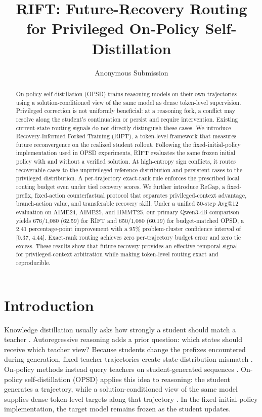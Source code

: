 \documentclass[letterpaper]{article}
\title{RIFT: Future-Recovery Routing for Privileged On-Policy Self-Distillation}
\author{Anonymous Submission}
\begin{document}
\maketitle

\begin{abstract}
On-policy self-distillation (OPSD) trains reasoning models on their own
trajectories using a solution-conditioned view of the same model as dense
token-level supervision. Privileged correction is not uniformly beneficial:
at a reasoning fork, a conflict may resolve along the student's continuation
or persist and require intervention. Existing current-state routing signals do
not directly distinguish these cases. We introduce Recovery-Informed Forked
Training (RIFT), a token-level framework that measures future reconvergence on
the realized student rollout. Following the fixed-initial-policy implementation
used in OPSD experiments, RIFT evaluates the same frozen initial policy with
and without a verified solution. At high-entropy sign conflicts, it routes
recoverable cases to the unprivileged reference distribution and persistent
cases to the privileged distribution. A per-trajectory exact-rank rule
enforces the prescribed local routing budget even under tied recovery scores.
We further introduce ReGap, a fixed-prefix, fixed-action counterfactual protocol
that separates privileged-context advantage, branch-action value, and
transferable recovery skill. Under a unified 50-step Avg@12 evaluation on
AIME24, AIME25, and HMMT25, our primary Qwen3-4B comparison yields 676/1,080
(62.59) for RIFT and 650/1,080 (60.19) for budget-matched OPSD, a 2.41
percentage-point improvement with a 95\% problem-cluster confidence interval
of [0.37, 4.44]. Exact-rank routing achieves zero per-trajectory budget error
and zero tie excess. These results show that future recovery provides an
effective temporal signal for privileged-context arbitration while making
token-level routing exact and reproducible.
\end{abstract}

\section{Introduction}

Knowledge distillation usually asks how strongly a student should match a
teacher \citep{hinton2015distilling,kim2016sequence}. Autoregressive reasoning
adds a prior question: which states should receive which teacher view? Because
students change the prefixes encountered during generation, fixed teacher
trajectories create state-distribution mismatch \citep{ross2011reduction}.
On-policy methods instead query teachers on student-generated sequences
\citep{agarwal2024gkd,gu2024minillm}. On-policy self-distillation (OPSD) applies
this idea to reasoning: the student generates a trajectory, while a
solution-conditioned view of the same model supplies dense token-level targets
along that trajectory \citep{zhao2026opsd}. In the fixed-initial-policy
implementation, the target model remains frozen as the student updates.
\end{document}
